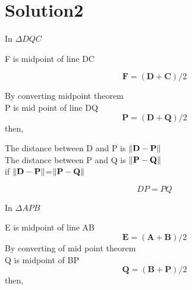 \documentclass[10pt, a4paper]{article}
\let\vec\mathbf
\begin{document}
		\section{Solution2}
	 In $\Delta DQC$\\
	 \begin{center}
      F is midpoint of line DC\\
      \end{center}
      \begin{equation}
        	\vec{F}=(\vec{D}+\vec{C})/2
      \end{equation}
       \begin{center}
	By converting midpoint theorem \\
	P is mid point of line DQ\\
	\begin{equation}
			\vec{P}=(\vec{D}+\vec{Q})/2
	\end{equation}
			then,\\
			\end{center}
			\begin{center}
			The distance between D and P is $\norm{\vec{D}-\vec{P}}$ \\
			The distance between P and Q is $\norm{\vec{P}-\vec{Q}}$\\
			if $\norm{\vec{D}-\vec{P}}$=$\norm{\vec{P}-\vec{Q}}$ \\
			\end{center}
			\begin{equation}
                DP=PQ 
			\end{equation}
			\begin{center}
\end{center}						 
	In $\Delta APB$\\
	\begin{center}
	E is midpoint of line AB\\
	\begin{equation}
			\vec{E}=(\vec{A}+\vec{B})/2
			\end{equation}
	By converting of mid point theorem\\
		Q is midpoint of BP\\
		\begin{equation}
			\vec{Q}=(\vec{B}+\vec{P})/2
			\end{equation}
			then,\\
	\end{center}
\end{document}
